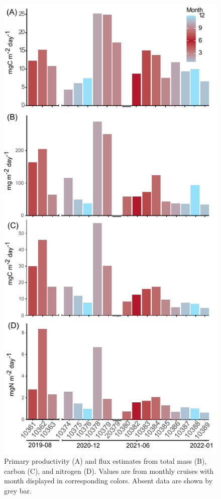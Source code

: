 \documentclass[
]{article}
\begin{document}
\begin{figure}

{\centering \includegraphics{images/03_prod-flux.pdf}

}

\caption{Primary productivity (A) and flux estimates from total mass
(B), carbon (C), and nitrogen (D). Values are from monthly cruises with
month displayed in corresponding colors. Absent data are shown by grey
bar.}

\end{figure}
\end{document}
